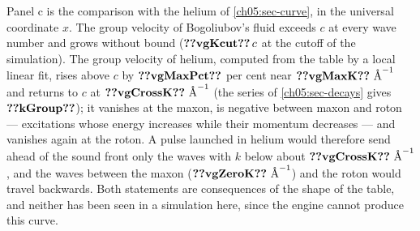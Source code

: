Panel c is the comparison with the helium of \cref{ch05:sec-curve}, in the universal coordinate $x$.
The group velocity of Bogoliubov's fluid exceeds $c$ at every wave number and grows without bound ($\cfiveV{vgKcut}\,c$ at the cutoff of the simulation).
The group velocity of helium, computed from the table by a local linear fit, rises above $c$ by $\cfiveV{vgMaxPct}$ per cent near $\cfiveV{vgMaxK}\ \cfiveAng^{-1}$ and returns to $c$ at $\cfiveV{vgCrossK}\ \cfiveAng^{-1}$ (the series of \cref{ch05:sec-decays} gives $\cfiveV{kGroup}$); it vanishes at the maxon, is negative between maxon and roton --- excitations whose energy increases while their momentum decreases --- and vanishes again at the roton.
A pulse launched in helium would therefore send ahead of the sound front only the waves with $k$ below about $\cfiveV{vgCrossK}\ \cfiveAng^{-1}$, and the waves between the maxon ($\cfiveV{vgZeroK}\ \cfiveAng^{-1}$) and the roton would travel backwards.
Both statements are consequences of the shape of the table, and neither has been seen in a simulation here, since the engine cannot produce this curve.

